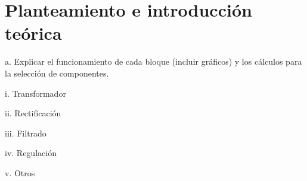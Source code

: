 \chapter{Planteamiento e introducción teórica}

a. Explicar el funcionamiento de cada bloque (incluir gráficos) y los cálculos
para la selección de componentes.

i. Transformador

ii. Rectificación

iii. Filtrado

iv. Regulación

v. Otros
